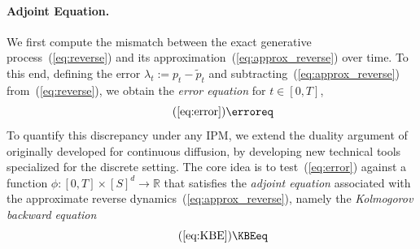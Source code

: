 \documentclass{article} %
\def\eqref#1{equation~\ref{#1}}
\renewcommand{\eqref}[1]{\textup{(\ref{#1})}}
\begin{document}
\paragraph{Adjoint Equation.} We first compute the mismatch between the exact generative process~\eqref{eq:reverse} and its approximation~\eqref{eq:approx_reverse} over time. To this end, defining the error $\lambda_t:=p_t-\tilde{p}_t$ and subtracting~\eqref{eq:approx_reverse} from~\eqref{eq:reverse}, we obtain the \emph{error equation} for $t \in [0, T]$,
\begin{equation}\tag{\ref*{eq:error}}
    \erroreq
\end{equation}
To quantify this discrepancy under any IPM, we extend the duality argument of \citet[Section~4.1]{mimikos2024score} originally developed for continuous diffusion, by developing new technical tools specialized for the discrete setting. The core idea is to test~\eqref{eq:error} against a function $\phi:[0, T] \times [S]^d \to \mathbb{R}$ that satisfies the \emph{adjoint equation} associated with the approximate reverse dynamics~\eqref{eq:approx_reverse}, namely the \emph{Kolmogorov backward equation} 
\begin{equation}\tag{\ref*{eq:KBE}} 
    \KBEeq
\end{equation}
\end{document}
